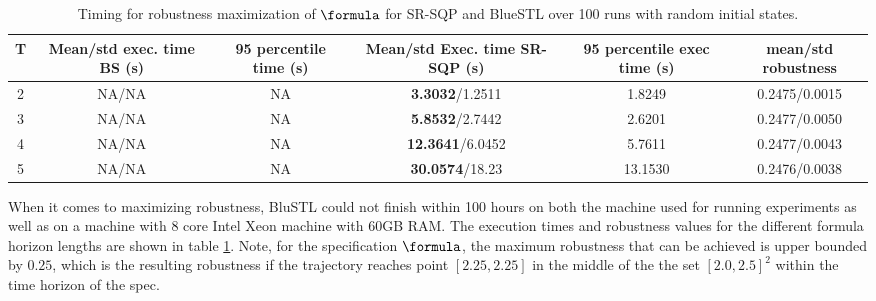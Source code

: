 \begin{table*}[tb]
\small
\begin{center}
\caption{{\small Timing for robustness maximization of $\formula$ for SR-SQP and BlueSTL over 100 runs with random initial states.}}
\vspace{-10pt}
\label{tbl:opt_performance_toy}
\begin{tabular} {|c|c|c|c|c|c|}
	\hline
	\textbf{T} & Mean/std exec. time BS (s) & 95 percentile time (s) &  Mean/std Exec. time SR-SQP (s) & 95 percentile exec time (s) & mean/std robustness\\ \hline
	2 & NA/NA & NA & \textbf{3.3032}/1.2511 & 1.8249 & 0.2475/0.0015\\ \hline
	3 & NA/NA & NA & \textbf{5.8532}/2.7442 & 2.6201 & 0.2477/0.0050\\ \hline
	4 & NA/NA & NA  & \textbf{12.3641}/6.0452 & 5.7611 & 0.2477/0.0043\\ \hline
	5 & NA/NA & NA  & \textbf{30.0574}/18.23 & 13.1530 & 0.2476/0.0038\\ \hline
\end{tabular}	
\end{center}
\vspace{-20pt}
\end{table*}

When it comes to maximizing robustness, BluSTL could not finish within 100 hours on both the machine used for running experiments as well as on a machine with 8 core Intel Xeon machine with 60GB RAM. The execution times and robustness values for the different formula horizon lengths are shown in table \ref{tbl:opt_performance_toy}. Note, for the specification $\formula$, the maximum robustness that can be achieved is upper bounded by $0.25$, which is the resulting robustness if the trajectory reaches point $[2.25,2.25]$ in the middle of the the set $[2.0,2.5]^2$ within the time horizon of the spec.